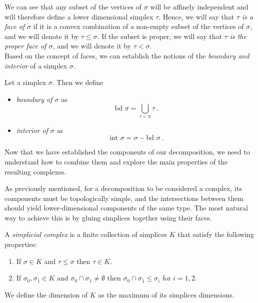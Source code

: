 \documentclass[../main.tex]{subfiles}
\begin{document}
We can see that any subset of the vertices of $\sigma$ will be affinely independent and will therefore define a lower dimensional simplex $\tau$. Hence, we will say that \emph{$\tau$ is a face of $\sigma$} if it is a convex combination of a non-empty subset of the vertices of $\sigma$, and we will denote it by $\tau \leq \sigma$. If the subset is proper, we will say that \emph{$\tau$ is the proper face of $\sigma$}, and we will denote it by $\tau < \sigma$.\\

Based on the concept of faces, we can establish the notions of the \emph{boundary and interior} of a simplex $\sigma$.

\begin{definition}
Let a simplex $\sigma$. Then we define
\begin{itemize}
	\item \emph{boundary of $\sigma$} as \[\text{bd } \sigma = \bigcup_{\tau<\sigma}\tau\,.\]
	\item \emph{interior of $\sigma$} as \[\text{int }\sigma= \sigma - \text{bd }\sigma\,.\]
\end{itemize}
\end{definition}

Now that we have established the components of our decomposition, we need to understand how to combine them and explore the main properties of the resulting complexes.

As previously mentioned, for a decomposition to be considered a complex, its components must be topologically simple, and the intersections between them should yield lower-dimensional components of the same type. The most natural way to achieve this is by gluing simplices together using their faces.

\begin{definition}
A \emph{simplicial complex} is a finite collection of simplices $K$ that satisfy the following properties:
\begin{enumerate}
	\item If $\sigma \in K$ and $\tau \leq \sigma$ then $\tau \in K$.
	\item If $\sigma_0,\sigma_1 \in K$ and $\sigma_0 \cap \sigma_1 \neq \emptyset$ then $\sigma_0 \cap \sigma_1 \leq \sigma_i$ for $i = 1,2$.
\end{enumerate}
\end{definition}

We define the dimension of $K$ as the maximum of its simplices dimensions.
\end{document}
